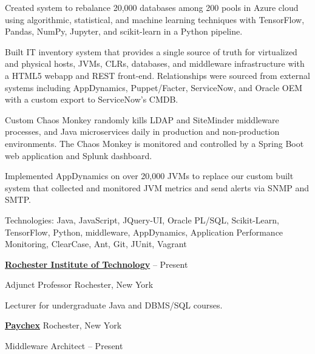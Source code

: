 \documentclass[letterpaper,MMMMyyyy,nonstopmode]{simpleresumecv}
\begin{document}
\begin{Body}
\begin{Detail}
\BulletItem
Created system to rebalance 20,000 databases among 200 pools in Azure cloud using algorithmic, statistical, and machine learning techniques with TensorFlow, Pandas, NumPy, Jupyter, and scikit-learn in a Python pipeline.

\BulletItem
Built IT inventory system that provides a single source of truth for virtualized and physical hosts, JVMs, CLRs, databases, and middleware infrastructure with a HTML5 webapp and REST front-end. Relationships were sourced from external systems including AppDynamics, Puppet/Facter, ServiceNow, and Oracle OEM with a custom export to ServiceNow’s CMDB. 

\BulletItem
Custom Chaos Monkey randomly kills LDAP and SiteMinder middleware processes, and Java microservices daily in production and non-production environments. The Chaos Monkey is monitored and controlled by a Spring Boot web application and Splunk dashboard.

\BulletItem
Implemented AppDynamics on over 20,000 JVMs to replace our custom built system that collected and monitored JVM metrics and send alerts via SNMP and SMTP.

\Gap
Technologies: Java, JavaScript, JQuery-UI, Oracle PL/SQL, Scikit-Learn, TensorFlow, Python, middleware, AppDynamics, Application Performance Monitoring, ClearCase, Ant, Git, JUnit, Vagrant
\end{Detail}

\BigGap

\Entry
\href{http://ist.rit.edu/}
{\textbf{Rochester Institute of Technology}}
\hfill
{} --
Present

Adjunct Professor
\hfill 
Rochester, New York

\begin{Detail}
\Item
Lecturer for undergraduate Java and DBMS/SQL courses.
\end{Detail}

\BigGap

\iffalse %
\Entry
\href{http://www.paychex.com/}
{\textbf{Paychex}}
\hfill 
Rochester, New York

Middleware Architect
\hfill
{} --
Present


\end{Body}
\end{document}
